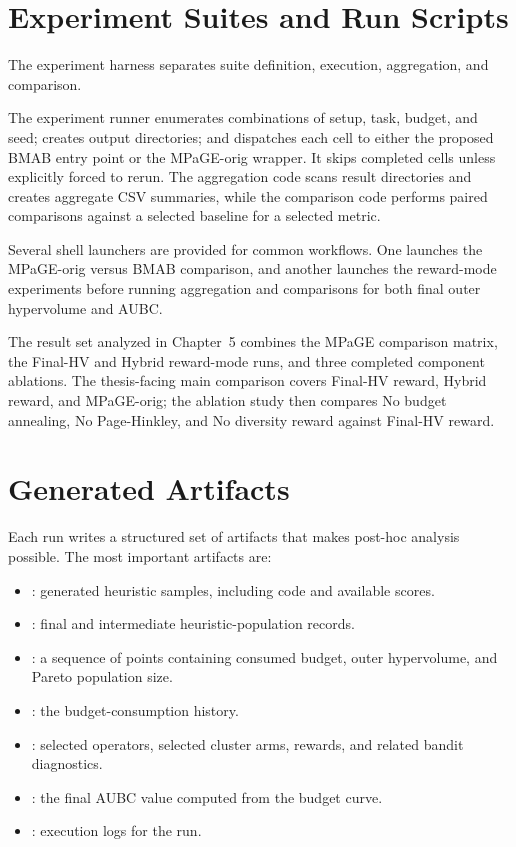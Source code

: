 \section{Experiment Suites and Run Scripts}

The experiment harness separates suite definition, execution, aggregation, and comparison.

The experiment runner enumerates combinations of setup, task, budget, and seed; creates output directories; and dispatches each cell to either the proposed BMAB entry point or the MPaGE-orig wrapper. It skips completed cells unless explicitly forced to rerun. The aggregation code scans result directories and creates aggregate CSV summaries, while the comparison code performs paired comparisons against a selected baseline for a selected metric.

Several shell launchers are provided for common workflows. One launches the MPaGE-orig versus BMAB comparison, and another launches the reward-mode experiments before running aggregation and comparisons for both final outer hypervolume and AUBC.

The result set analyzed in Chapter~5 combines the MPaGE comparison matrix, the Final-HV and Hybrid reward-mode runs, and three completed component ablations. The thesis-facing main comparison covers Final-HV reward, Hybrid reward, and MPaGE-orig; the ablation study then compares No budget annealing, No Page-Hinkley, and No diversity reward against Final-HV reward.

\section{Generated Artifacts}

Each run writes a structured set of artifacts that makes post-hoc analysis possible. The most important artifacts are:

\begin{itemize}
  \item {}: generated heuristic samples, including code and available scores.
  \item {}: final and intermediate heuristic-population records.
  \item {}: a sequence of points containing consumed budget, outer hypervolume, and Pareto population size.
  \item {}: the budget-consumption history.
  \item {}: selected operators, selected cluster arms, rewards, and related bandit diagnostics.
  \item {}: the final AUBC value computed from the budget curve.
  \item {}: execution logs for the run.
\end{itemize}

